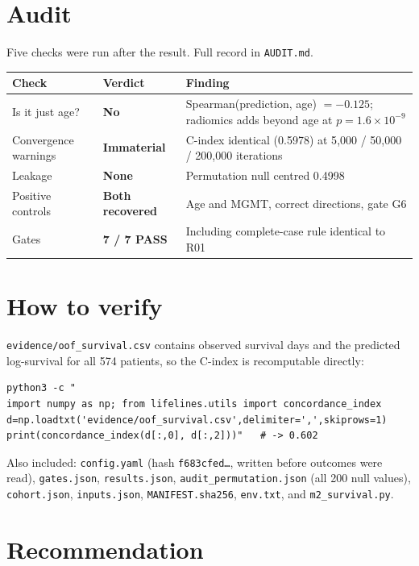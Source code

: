\documentclass[11pt,a4paper]{article}
\begin{document}
\section{Audit}

Five checks were run after the result. Full record in \texttt{AUDIT.md}.

\begin{center}
\begin{tabular}{@{}llp{7.4cm}@{}}
\toprule
\textbf{Check} & \textbf{Verdict} & \textbf{Finding} \\
\midrule
Is it just age? & \textbf{No} & Spearman(prediction, age) $=-0.125$; radiomics adds beyond age at $p=1.6\times10^{-9}$ \\
Convergence warnings & \textbf{Immaterial} & C-index identical (0.5978) at 5{,}000 / 50{,}000 / 200{,}000 iterations \\
Leakage & \textbf{None} & Permutation null centred 0.4998 \\
Positive controls & \textbf{Both recovered} & Age and MGMT, correct directions, gate G6 \\
Gates & \textbf{7 / 7 PASS} & Including complete-case rule identical to R01 \\
\bottomrule
\end{tabular}
\end{center}

\section{How to verify}

\texttt{evidence/oof\_survival.csv} contains observed survival days and the predicted
log-survival for all 574 patients, so the C-index is recomputable directly:

\begin{verbatim}
python3 -c "
import numpy as np; from lifelines.utils import concordance_index
d=np.loadtxt('evidence/oof_survival.csv',delimiter=',',skiprows=1)
print(concordance_index(d[:,0], d[:,2]))"   # -> 0.602
\end{verbatim}

\noindent
Also included: \texttt{config.yaml} (hash \texttt{f683cfed\ldots}, written before outcomes
were read), \texttt{gates.json}, \texttt{results.json}, \texttt{audit\_permutation.json}
(all 200 null values), \texttt{cohort.json}, \texttt{inputs.json},
\texttt{MANIFEST.sha256}, \texttt{env.txt}, and \texttt{m2\_survival.py}.

\section{Recommendation}
\end{document}
